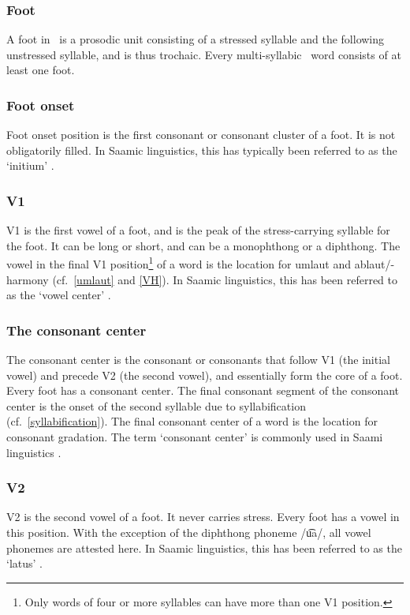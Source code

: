\subsubsection{Foot}\label{foot}
A {foot} in \PS\ is a prosodic unit consisting of a stressed syllable and the following unstressed syllable, and is thus trochaic. Every multi-syllabic \PS\ word consists of at least one foot. 

\subsubsection{Foot onset}\label{footOnset}
{Foot onset} position is the first consonant or consonant cluster of a foot. It is not obligatorily filled. 
In Saamic linguistics, this has typically been referred to as the ‘initium’ \citep[cf.][39]{Sammallahti1998}.

\subsubsection{V1}\label{v1}
{V1} is the first vowel of a foot, and is the peak of the stress-carrying syllable for the foot. It can be long or short, and can be a monophthong or a diphthong. The vowel in the final V1 position\footnote{Only words of four or more syllables can have more than one V1 position.}
 of a word is the location for umlaut and ablaut/-harmony (cf.~\SEC\ref{umlaut} and \SEC\ref{VH}). 
In Saamic linguistics, this has been referred to as the ‘vowel center’ \citep[cf.][39]{Sammallahti1998}.

\subsubsection{The consonant center}\label{CCent}
The {consonant center} is the consonant or consonants that follow V1 (the initial vowel) and precede V2 (the second vowel), and essentially form the core 
of a foot. Every foot has a consonant center. The final consonant segment of the consonant center is the onset of the second syllable due to syllabification (cf.~\SEC\ref{syllabification}). The final consonant center of a word is the location for consonant gradation. The term ‘consonant center’ is commonly used in Saami linguistics \citep[cf.][39]{Sammallahti1998}. 

\subsubsection{V2}\label{v2}
{V2} is the second vowel of a foot. It never carries stress. Every foot has a vowel in this position. With the exception of the diphthong phoneme /u͡a/, all vowel phonemes are attested here. 
In Saamic linguistics, this has been referred to as the ‘latus’ \citep[cf.][39]{Sammallahti1998}.

